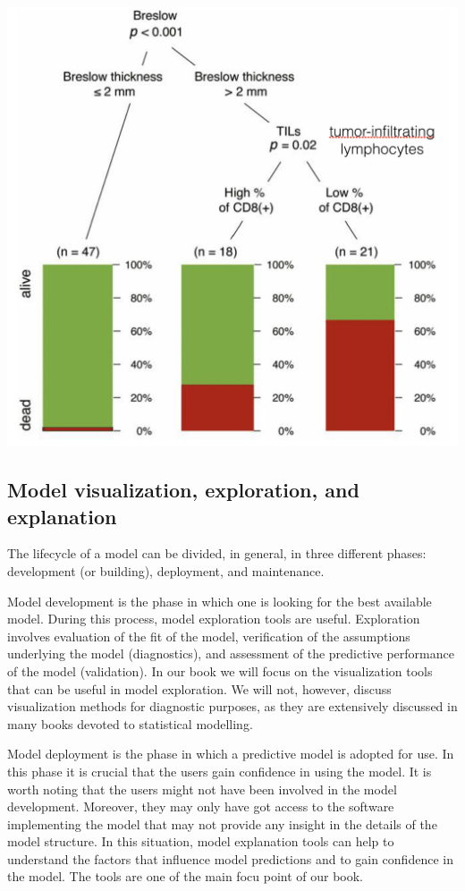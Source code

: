 \documentclass[]{krantz}
\theoremstyle{definition}
\theoremstyle{definition}
\theoremstyle{definition}
\theoremstyle{remark}
\begin{document}
\begin{center}\includegraphics[width=0.5\linewidth]{figure/wbBILL8model} \end{center}

\hypertarget{model-visualization-exploration-and-explanation}{%
\subsection{Model visualization, exploration, and
explanation}\label{model-visualization-exploration-and-explanation}}

The lifecycle of a model can be divided, in general, in three different
phases: development (or building), deployment, and maintenance.

Model development is the phase in which one is looking for the best
available model. During this process, model exploration tools are
useful. Exploration involves evaluation of the fit of the model,
verification of the assumptions underlying the model (diagnostics), and
assessment of the predictive performance of the model (validation). In
our book we will focus on the visualization tools that can be useful in
model exploration. We will not, however, discuss visualization methods
for diagnostic purposes, as they are extensively discussed in many books
devoted to statistical modelling.

Model deployment is the phase in which a predictive model is adopted for
use. In this phase it is crucial that the users gain confidence in using
the model. It is worth noting that the users might not have been
involved in the model development. Moreover, they may only have got
access to the software implementing the model that may not provide any
insight in the details of the model structure. In this situation, model
explanation tools can help to understand the factors that influence
model predictions and to gain confidence in the model. The tools are one
of the main focu point of our book.
\end{document}
